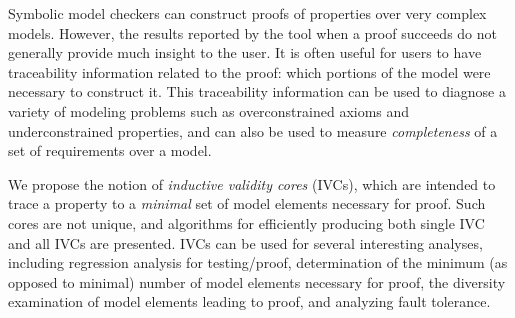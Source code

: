 Symbolic model checkers can construct proofs of properties over
very complex models. However, the results reported by the tool
when a proof succeeds do not generally provide much insight to
the user. It is often useful for users to have traceability information related to the proof: which portions of the model were necessary to construct it.  This traceability information can be used to diagnose a variety of modeling problems such as overconstrained axioms and underconstrained properties, and can also be used to measure {\em completeness} of a set of requirements over a model.

We propose the notion of {\em inductive validity cores} (IVCs), which are intended to trace a property to a \emph{minimal} set of model elements necessary for proof. Such cores are not unique, and algorithms for efficiently producing both single IVC and all IVCs are presented. IVCs can be used for several interesting analyses, including
regression analysis for testing/proof, determination of the minimum (as
opposed to minimal) number of model elements necessary for proof, the
diversity examination of model elements leading to proof, and analyzing fault
tolerance.
